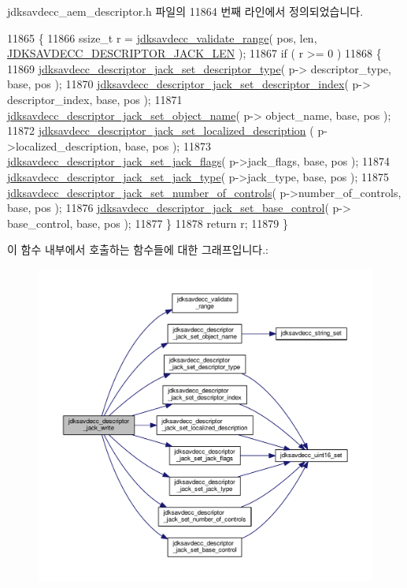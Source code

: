 jdksavdecc\+\_\+aem\+\_\+descriptor.\+h 파일의 11864 번째 라인에서 정의되었습니다.


\begin{DoxyCode}
11865 \{
11866     ssize\_t r = \hyperlink{group__util_ga9c02bdfe76c69163647c3196db7a73a1}{jdksavdecc\_validate\_range}( pos, len, 
      \hyperlink{group__descriptor__jack_ga3078d0ebe3d0d3bb58c01b9b0e984d23}{JDKSAVDECC\_DESCRIPTOR\_JACK\_LEN} );
11867     \textcolor{keywordflow}{if} ( r >= 0 )
11868     \{
11869         \hyperlink{group__descriptor__jack_gaa126ded038d591375b4f4fe13c376b74}{jdksavdecc\_descriptor\_jack\_set\_descriptor\_type}( p->
      descriptor\_type, base, pos );
11870         \hyperlink{group__descriptor__jack_gaf1dc5723e83126ed8adfa317b05e5452}{jdksavdecc\_descriptor\_jack\_set\_descriptor\_index}( p->
      descriptor\_index, base, pos );
11871         \hyperlink{group__descriptor__jack_ga247a91866f4938403b92b73d468a6e5e}{jdksavdecc\_descriptor\_jack\_set\_object\_name}( p->
      object\_name, base, pos );
11872         \hyperlink{group__descriptor__jack_gabe6dec09b0a44d5b8cfe8dfb4ab0d33a}{jdksavdecc\_descriptor\_jack\_set\_localized\_description}
      ( p->localized\_description, base, pos );
11873         \hyperlink{group__descriptor__jack_ga9a5a3726f7f2ae7d6487c9d237a2e55d}{jdksavdecc\_descriptor\_jack\_set\_jack\_flags}( p->jack\_flags, 
      base, pos );
11874         \hyperlink{group__descriptor__jack_ga5edb1fc0eae78c6f028b5ddb95b9e19c}{jdksavdecc\_descriptor\_jack\_set\_jack\_type}( p->jack\_type, 
      base, pos );
11875         \hyperlink{group__descriptor__jack_ga03e53983195c6a9bb43e199536246730}{jdksavdecc\_descriptor\_jack\_set\_number\_of\_controls}(
       p->number\_of\_controls, base, pos );
11876         \hyperlink{group__descriptor__jack_gab3777f216d0c36766c891a9493988965}{jdksavdecc\_descriptor\_jack\_set\_base\_control}( p->
      base\_control, base, pos );
11877     \}
11878     \textcolor{keywordflow}{return} r;
11879 \}
\end{DoxyCode}


이 함수 내부에서 호출하는 함수들에 대한 그래프입니다.\+:
\nopagebreak
\begin{figure}[H]
\begin{center}
\leavevmode
\includegraphics[width=350pt]{group__descriptor__jack_gaf5219748d05f3a584139d4388656b95e_cgraph}
\end{center}
\end{figure}


